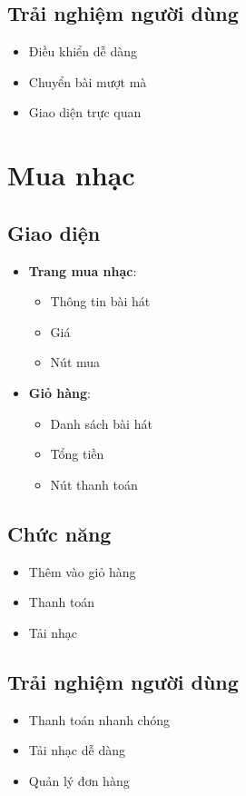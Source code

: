 \documentclass{article}
\begin{document}
\subsection{Trải nghiệm người dùng}
\begin{itemize}
    \item Điều khiển dễ dàng
    \item Chuyển bài mượt mà
    \item Giao diện trực quan
\end{itemize}

\section{Mua nhạc}
\subsection{Giao diện}
\begin{itemize}
    \item \textbf{Trang mua nhạc}:
    \begin{itemize}
        \item Thông tin bài hát
        \item Giá
        \item Nút mua
    \end{itemize}
    \item \textbf{Giỏ hàng}:
    \begin{itemize}
        \item Danh sách bài hát
        \item Tổng tiền
        \item Nút thanh toán
    \end{itemize}
\end{itemize}

\subsection{Chức năng}
\begin{itemize}
    \item Thêm vào giỏ hàng
    \item Thanh toán
    \item Tải nhạc
\end{itemize}

\subsection{Trải nghiệm người dùng}
\begin{itemize}
    \item Thanh toán nhanh chóng
    \item Tải nhạc dễ dàng
    \item Quản lý đơn hàng
\end{itemize}
\end{document}

